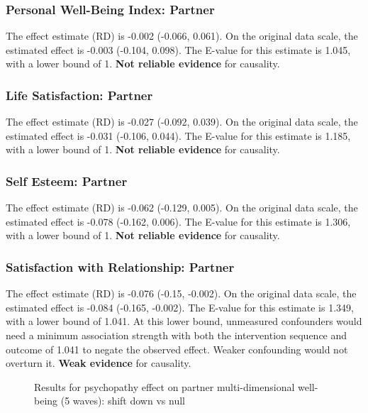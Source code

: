 \documentclass[
  singlecolumn]{article}
\begin{document}
\subsubsection{Personal Well-Being Index:
Partner}\label{personal-well-being-index-partner-18}

The effect estimate (RD) is -0.002 (-0.066, 0.061). On the original data
scale, the estimated effect is -0.003 (-0.104, 0.098). The E-value for
this estimate is 1.045, with a lower bound of 1. \textbf{Not reliable
evidence} for causality.

\subsubsection{Life Satisfaction:
Partner}\label{life-satisfaction-partner-18}

The effect estimate (RD) is -0.027 (-0.092, 0.039). On the original data
scale, the estimated effect is -0.031 (-0.106, 0.044). The E-value for
this estimate is 1.185, with a lower bound of 1. \textbf{Not reliable
evidence} for causality.

\subsubsection{Self Esteem: Partner}\label{self-esteem-partner-18}

The effect estimate (RD) is -0.062 (-0.129, 0.005). On the original data
scale, the estimated effect is -0.078 (-0.162, 0.006). The E-value for
this estimate is 1.306, with a lower bound of 1. \textbf{Not reliable
evidence} for causality.

\subsubsection{Satisfaction with Relationship:
Partner}\label{satisfaction-with-relationship-partner-18}

The effect estimate (RD) is -0.076 (-0.15, -0.002). On the original data
scale, the estimated effect is -0.084 (-0.165, -0.002). The E-value for
this estimate is 1.349, with a lower bound of 1.041. At this lower
bound, unmeasured confounders would need a minimum association strength
with both the intervention sequence and outcome of 1.041 to negate the
observed effect. Weaker confounding would not overturn it. \textbf{Weak
evidence} for causality.

\begin{figure}


\caption{\label{fig-results-psychopathy-partner-down-long}Results for
psychopathy effect on partner multi-dimensional well-being (5 waves):
shift down vs null}

\end{figure}%
\end{document}
